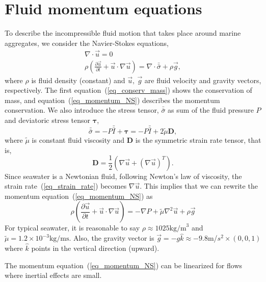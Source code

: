 \section{Fluid momentum equations}
To describe the incompressible fluid motion that takes place around marine aggregates, we consider the Navier-Stokes equations,
\begin{align}
\nabla \cdot \vec{u} = 0 
\label{eq_conserv_mass} \\
\rho 
\left( 
   \frac{\partial \vec{u}}{\partial t} + \vec{u}\cdot \nabla \vec{u}
\right)
  = \nabla \cdot \bar{\bar{\sigma}} +  \rho  \vec{g} ,
\label{eq_momentum_NS}
\end{align}
where $ \rho$ is fluid density (constant) and $\vec{u}, \ \vec{g}$ are fluid velocity and gravity vectors, respectively.
The first equation~(\ref{eq_conserv_mass}) shows the conservation of mass, and equation~(\ref{eq_momentum_NS}) describes the momentum conservation. 
We also introduce the stress tensor, $\bar{\bar{\sigma}}$ as sum of the fluid pressure $P$ and deviatoric stress tensor $\bm{\tau}$,
\begin{equation}
   \bar{\bar{\sigma}} =-P \bar{\bar{I}} + {\bm \tau} = -P \bar{\bar{I}} + 2{\tilde{\mu}} {\bm D},
   \label{eq_stress_tensor}
\end{equation}
where ${\tilde{\mu}}$ is constant fluid viscosity and ${\bm D}$ is the symmetric strain rate tensor, that is,
\begin{equation}
   \boldsymbol{D} = \frac{1}{2} \left( \nabla \vec{u} + {(\nabla  \vec{u} )}^T \right).
   \label{eq_strain_rate}
   \end{equation}
Since seawater is a Newtonian fluid, following Newton's law of viscosity, the strain rate~(\ref{eq_strain_rate}) becomes $\nabla \vec{u}$. This implies that we can rewrite the momentum equation~(\ref{eq_momentum_NS}) as
\begin{equation}
  \rho \left( 
   \frac{\partial \vec{u}}{\partial t} + \vec{u}\cdot \nabla \vec{u}
\right)
  = -\nabla P  + {\tilde{\mu}} \nabla^2 \vec{u}+  \rho  \vec{g} 
  \label{eq_stokes_momentum}
\end{equation}
For typical seawater, it is reasonable to say $\rho \approx 1025 \text{kg/m}^3$ and ${\tilde{\mu}} = 1.2 \times 10^{-3}\text{kg}/\text{ms}$.
Also, the gravity vector is $\vec{g} = - g\hat{k} \approx -9.8$m/$s^2 \times (0,0,1)$ where $\hat{k}$ points in the vertical direction (upward). 
\par
 The momentum equation~(\ref{eq_momentum_NS}) can be linearized for flows where inertial effects are small. 
